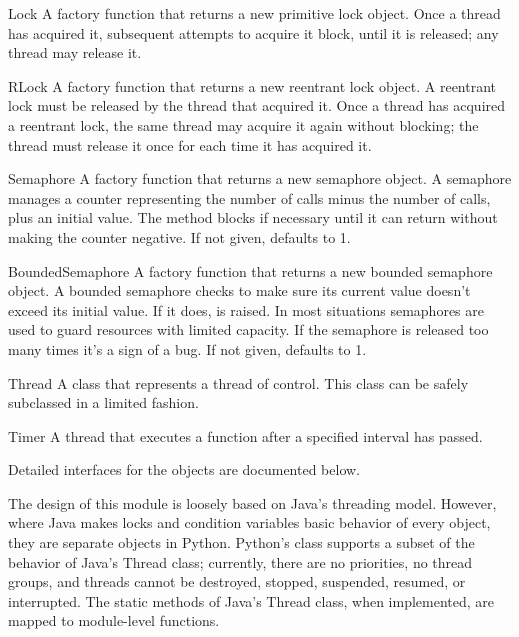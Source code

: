 \begin{funcdesc}{Lock}{}
A factory function that returns a new primitive lock object.  Once
a thread has acquired it, subsequent attempts to acquire it block,
until it is released; any thread may release it.
\end{funcdesc}

\begin{funcdesc}{RLock}{}
A factory function that returns a new reentrant lock object.
A reentrant lock must be released by the thread that acquired it.
Once a thread has acquired a reentrant lock, the same thread may
acquire it again without blocking; the thread must release it once
for each time it has acquired it.
\end{funcdesc}

\begin{funcdesc}{Semaphore}{}
A factory function that returns a new semaphore object.  A
semaphore manages a counter representing the number of 
calls minus the number of  calls, plus an initial value.
The  method blocks if necessary until it can return
without making the counter negative.  If not given,  defaults to
1. 
\end{funcdesc}

\begin{funcdesc}{BoundedSemaphore}{}
A factory function that returns a new bounded semaphore object.  A bounded
semaphore checks to make sure its current value doesn't exceed its initial
value.  If it does,  is raised. In most situations
semaphores are used to guard resources with limited capacity.  If the
semaphore is released too many times it's a sign of a bug.  If not given,
 defaults to 1. 
\end{funcdesc}

\begin{classdesc*}{Thread}{}
A class that represents a thread of control.  This class can be safely
subclassed in a limited fashion.
\end{classdesc*}

\begin{classdesc*}{Timer}{}
A thread that executes a function after a specified interval has passed.
\end{classdesc*}

Detailed interfaces for the objects are documented below.  

The design of this module is loosely based on Java's threading model.
However, where Java makes locks and condition variables basic behavior
of every object, they are separate objects in Python.  Python's 
class supports a subset of the behavior of Java's Thread class;
currently, there are no priorities, no thread groups, and threads
cannot be destroyed, stopped, suspended, resumed, or interrupted.  The
static methods of Java's Thread class, when implemented, are mapped to
module-level functions.

